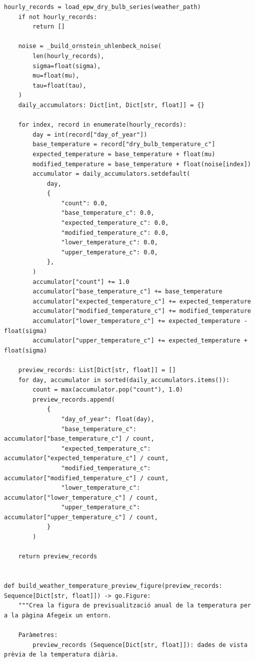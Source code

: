 \documentclass[10pt,a4paper]{article}
\begin{document}
\begin{lstlisting}[style=studioPython,caption={backend/weather\_profiles.py},label={lst:backend-weather-profiles-py}]
    hourly_records = load_epw_dry_bulb_series(weather_path)
    if not hourly_records:
        return []

    noise = _build_ornstein_uhlenbeck_noise(
        len(hourly_records),
        sigma=float(sigma),
        mu=float(mu),
        tau=float(tau),
    )
    daily_accumulators: Dict[int, Dict[str, float]] = {}

    for index, record in enumerate(hourly_records):
        day = int(record["day_of_year"])
        base_temperature = record["dry_bulb_temperature_c"]
        expected_temperature = base_temperature + float(mu)
        modified_temperature = base_temperature + float(noise[index])
        accumulator = daily_accumulators.setdefault(
            day,
            {
                "count": 0.0,
                "base_temperature_c": 0.0,
                "expected_temperature_c": 0.0,
                "modified_temperature_c": 0.0,
                "lower_temperature_c": 0.0,
                "upper_temperature_c": 0.0,
            },
        )
        accumulator["count"] += 1.0
        accumulator["base_temperature_c"] += base_temperature
        accumulator["expected_temperature_c"] += expected_temperature
        accumulator["modified_temperature_c"] += modified_temperature
        accumulator["lower_temperature_c"] += expected_temperature - float(sigma)
        accumulator["upper_temperature_c"] += expected_temperature + float(sigma)

    preview_records: List[Dict[str, float]] = []
    for day, accumulator in sorted(daily_accumulators.items()):
        count = max(accumulator.pop("count"), 1.0)
        preview_records.append(
            {
                "day_of_year": float(day),
                "base_temperature_c": accumulator["base_temperature_c"] / count,
                "expected_temperature_c": accumulator["expected_temperature_c"] / count,
                "modified_temperature_c": accumulator["modified_temperature_c"] / count,
                "lower_temperature_c": accumulator["lower_temperature_c"] / count,
                "upper_temperature_c": accumulator["upper_temperature_c"] / count,
            }
        )

    return preview_records


def build_weather_temperature_preview_figure(preview_records: Sequence[Dict[str, float]]) -> go.Figure:
    """Crea la figura de previsualització anual de la temperatura per a la pàgina Afegeix un entorn.

    Paràmetres:
        preview_records (Sequence[Dict[str, float]]): dades de vista prèvia de la temperatura diària.


\end{lstlisting}
\end{document}
